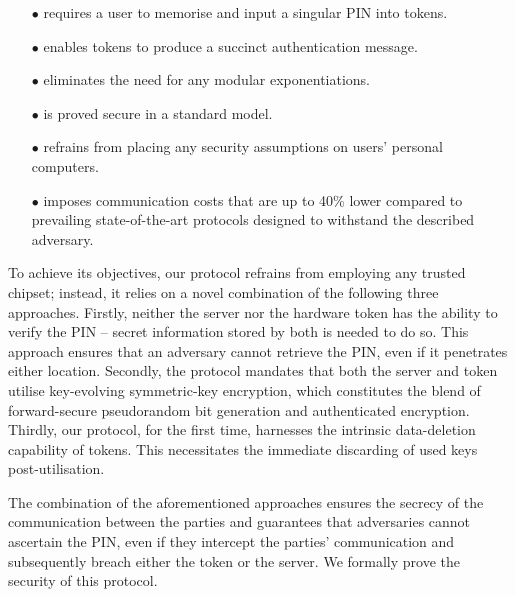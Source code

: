 \begin{itemize}[leftmargin=4.5mm]
\item[$\bullet$] requires a user to memorise and input a singular PIN into tokens.

\item[$\bullet$] enables tokens to produce a succinct authentication message.

\item[$\bullet$] eliminates the need for any modular exponentiations.

\item[$\bullet$] is proved secure in a standard model.

\item[$\bullet$] refrains from placing any security assumptions on users' personal computers.

\item[$\bullet$]  imposes communication costs that are up to 40\% lower compared to prevailing state-of-the-art protocols designed to withstand the described adversary. 


\end{itemize}

To achieve its objectives, our protocol refrains from employing any trusted chipset; instead, it relies on a novel combination of the following three approaches. 
%
Firstly, neither the server nor the hardware token has the ability to verify the PIN -- secret information stored by both is needed to do so. This approach ensures that an adversary cannot retrieve the PIN, even if it penetrates either location. 
%
Secondly, the protocol mandates that both the server and token utilise key-evolving symmetric-key encryption, which constitutes the blend of forward-secure pseudorandom bit generation and authenticated encryption. 
%
Thirdly, our protocol, for the first time, harnesses the intrinsic data-deletion capability of tokens. This necessitates the immediate discarding of used keys post-utilisation. 

The combination of the aforementioned approaches ensures the secrecy of the communication between the parties and guarantees that adversaries cannot ascertain the PIN, even if they intercept the parties' communication and subsequently breach either the token or the server. We formally prove the security of this protocol. 






